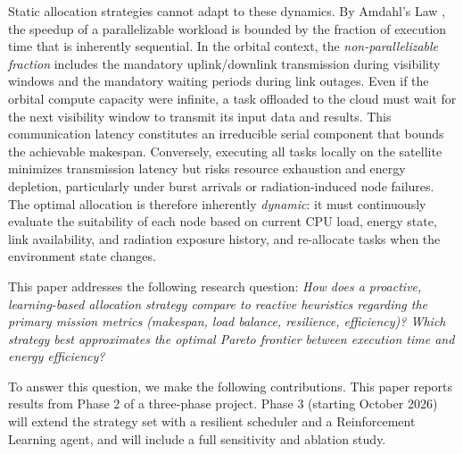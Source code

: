 \documentclass[conference]{IEEEtran}
\begin{document}
Static allocation strategies cannot adapt to these dynamics. By Amdahl's Law \cite{amdahl1967validity}, the speedup of a parallelizable workload is bounded by the fraction of execution time that is inherently sequential. In the orbital context, the \textit{non-parallelizable fraction} includes the mandatory uplink/downlink transmission during visibility windows and the mandatory waiting periods during link outages. Even if the orbital compute capacity were infinite, a task offloaded to the cloud must wait for the next visibility window to transmit its input data and results. This communication latency constitutes an irreducible serial component that bounds the achievable makespan. Conversely, executing all tasks locally on the satellite minimizes transmission latency but risks resource exhaustion and energy depletion, particularly under burst arrivals or radiation-induced node failures. The optimal allocation is therefore inherently \textit{dynamic}: it must continuously evaluate the suitability of each node based on current CPU load, energy state, link availability, and radiation exposure history, and re-allocate tasks when the environment state changes.

This paper addresses the following research question: \textit{How does a proactive, learning-based allocation strategy compare to reactive heuristics regarding the primary mission metrics (makespan, load balance, resilience, efficiency)? Which strategy best approximates the optimal Pareto frontier between execution time and energy efficiency?}

To answer this question, we make the following contributions. This paper reports results from Phase 2 of a three-phase project. Phase 3 (starting October 2026) will extend the strategy set with a resilient scheduler and a Reinforcement Learning agent, and will include a full sensitivity and ablation study.
\end{document}
